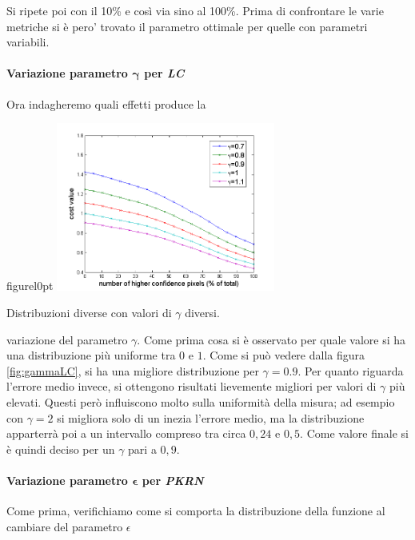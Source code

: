 \documentclass[12pt]{report}
\begin{document}
		\noindent Si ripete poi con il 10\% e così via sino al 100\%. Prima di confrontare le varie metriche si è pero' trovato il parametro ottimale per quelle con parametri variabili.
		
		\paragraph{Variazione parametro $\bm{\gamma}$ per \textit{LC}}
		\label{par:gamma}
		
			Ora indagheremo quali effetti produce la 
		
		
			\begin{wrapfloat}{figure}{l}{0pt}
				\includegraphics[width=0.54\textwidth]{./figures/gamma_LC.png}
				\caption{Distribuzioni diverse con valori di $\gamma$ diversi.}
				\label{fig:gammaLC}
			\end{wrapfloat} 
		
			\noindent variazione  del parametro $\gamma$. Come prima cosa si è osservato per quale valore si ha una distribuzione più uniforme tra $0$ e $1$. Come si può vedere dalla figura \ref{fig:gammaLC}, si ha una migliore distribuzione per $\gamma=0.9$. Per quanto riguarda l'errore medio invece, si ottengono risultati lievemente migliori per valori di $\gamma$ più elevati. Questi però influiscono molto sulla uniformità della misura; ad esempio con $\gamma=2$ si migliora solo di un inezia l'errore medio, ma la distribuzione apparterrà poi a un intervallo compreso tra circa $0,24$ e $0,5$. Come valore finale si è quindi deciso per un $\gamma$ pari a $0,9$. \newline
		
		\paragraph{Variazione parametro $\bm{\epsilon}$ per \textit{PKRN}}
		\label{par:epsilon}
		
			Come prima, verifichiamo come si comporta la distribuzione della funzione al cambiare del parametro $\epsilon$
		  		
\end{document}

